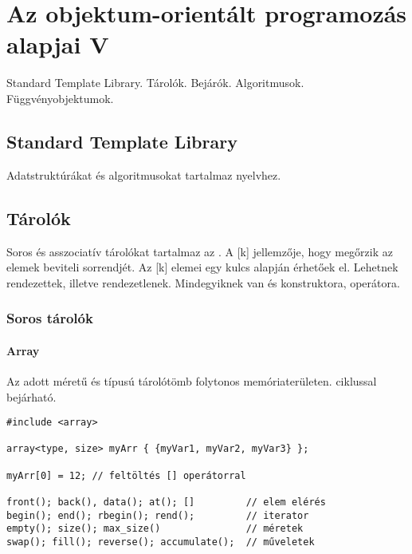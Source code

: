 \documentclass[../../main.tex]{subfiles}
\begin{document}
\section{Az objektum-orientált programozás alapjai V}

\begin{fulltheorem}
	Standard Template Library. Tárolók. Bejárók. Algoritmusok. Függvényobjektumok.
\end{fulltheorem}

\subsection{Standard Template Library}

Adatstruktúrákat és algoritmusokat tartalmaz  nyelvhez.

\subsection{Tárolók}

Soros és asszociatív tárolókat tartalmaz az .
A [k] jellemzője, hogy megőrzik az elemek beviteli
sorrendjét. Az [k] elemei egy kulcs alapján érhetőek
el. Lehetnek rendezettek, illetve rendezetlenek. Mindegyiknek van 
és  konstruktora, \blackc{=} operátora.

\subsubsection*{Soros tárolók}

\paragraph*{Array}

Az  adott méretű és típusú tárolótömb folytonos memóriaterületen.
 ciklussal bejárható.

\begin{verbatim}
#include <array>

array<type, size> myArr { {myVar1, myVar2, myVar3} };

myArr[0] = 12; // feltöltés [] operátorral

front(); back(), data(); at(); []         // elem elérés
begin(); end(); rbegin(); rend();         // iterator
empty(); size(); max_size()               // méretek
swap(); fill(); reverse(); accumulate();  // műveletek
\end{verbatim}
\end{document}
